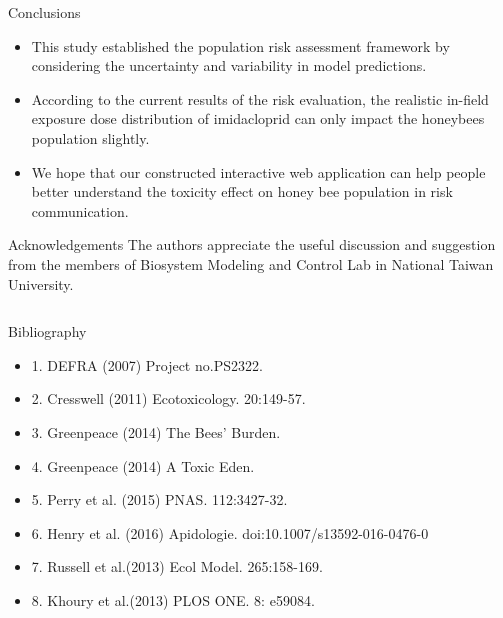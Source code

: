 \documentclass[final,t]{beamer}
\begin{document}
\begin{frame}[fragile]
\begin{columns}[t]
\begin{column}{0.38\linewidth}
      \begin{block}{Conclusions}
        \begin{itemize}
          \item This study established the population risk assessment framework by considering the uncertainty and variability in model predictions.
          \item According to the current results of the risk evaluation, the realistic in-field exposure dose distribution of imidacloprid can only impact the honeybees population slightly.
          \item We hope that our constructed interactive web application can help people better understand the toxicity effect on honey bee population in risk communication.
        \end{itemize}
		\end{block}

      \begin{block}{Acknowledgements}
      The authors appreciate the useful discussion and suggestion from the members of Biosystem Modeling and Control Lab in National Taiwan University.

		\end{block}

 \begin{columns}[onlytextwidth, t]
      \begin{block}{Bibliography}
        \begin{itemize}
          \item 1. DEFRA (2007) Project no.PS2322.
          \item 2. Cresswell (2011) Ecotoxicology. 20:149-57.
          \item 3. Greenpeace (2014) The Bees' Burden.
          \item 4. Greenpeace (2014) A Toxic Eden.
          \item 5. Perry et al. (2015) PNAS. 112:3427-32.
          \item 6. Henry et al. (2016) Apidologie. doi:10.1007/s13592-016-0476-0 
          \item 7. Russell et al.(2013) Ecol Model. 265:158-169.
          \item 8. Khoury et al.(2013) PLOS ONE. 8: e59084. 
        \end{itemize}
		\end{block}


\end{columns}
\end{column}
\end{columns}
\end{frame}
\end{document}
